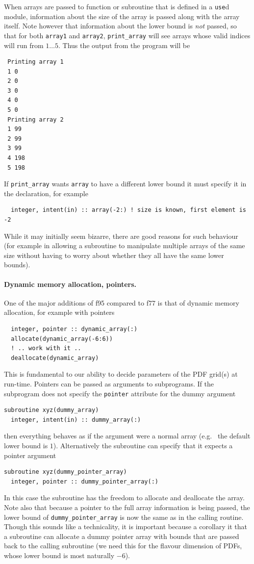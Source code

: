 \documentclass[12pt]{article}
\newcommand{\eg}{e.g.\ }
\begin{document}
When arrays are passed to function or subroutine that is defined in a
\texttt{use}d module, information about the size of the array is
passed along with the array itself. Note however that information
about the lower bound is \emph{not} passed, so that for both
\texttt{array1} and \texttt{array2}, \texttt{print\_array} will see
arrays whose valid indices will run from $1\ldots5$. Thus the output
from the program will be
\begin{lstlisting}
 Printing array 1
 1 0
 2 0
 3 0
 4 0
 5 0
 Printing array 2
 1 99
 2 99
 3 99
 4 198
 5 198
\end{lstlisting}
If \texttt{print\_array} wants \texttt{array} to have a different lower
bound it must specify it in the declaration, for example
\begin{lstlisting}
  integer, intent(in) :: array(-2:) ! size is known, first element is -2
\end{lstlisting}
While it may initially seem bizarre, there are good reasons for such
behaviour (for example in allowing a subroutine to manipulate multiple
arrays of the same size without having to worry about whether they all
have the same lower bounds).

\paragraph{Dynamic memory allocation, pointers.} One of the major
additions of f95 compared to f77 is that of dynamic memory allocation,
for example with pointers
\begin{lstlisting}
  integer, pointer :: dynamic_array(:)
  allocate(dynamic_array(-6:6))
  ! .. work with it ..
  deallocate(dynamic_array)
\end{lstlisting}
This is fundamental to our ability to decide parameters of the PDF
grid(s) at run-time. Pointers can be passed as arguments to subprograms.
If the subprogram does not specify the \texttt{pointer} attribute for
the dummy argument
\begin{lstlisting}
subroutine xyz(dummy_array)
  integer, intent(in) :: dummy_array(:)
\end{lstlisting}
then everything behaves as if the argument were a normal array (\eg
the default lower bound is $1$). Alternatively the subroutine can
specify that it expects a pointer argument
\begin{lstlisting}
subroutine xyz(dummy_pointer_array)
  integer, pointer :: dummy_pointer_array(:)
\end{lstlisting}
In this case the subroutine has the freedom to allocate and deallocate
the array. Note also that because a pointer to the full array
information is being passed, the lower bound of \texttt{dummy\_pointer\_array}
is now the same as in the calling routine. Though this sounds like a
technicality, it is important because a corollary it that a subroutine
can allocate a dummy pointer array with bounds that are passed back to
the calling subroutine (we need this for the flavour dimension of
PDFs, whose lower bound is most naturally $-6$). 
\end{document}
